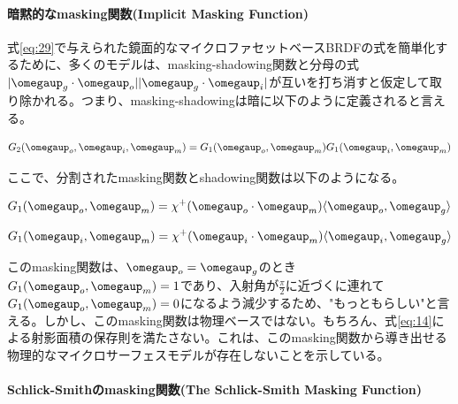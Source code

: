 \documentclass[a4j,xelatex,ja=standard]{bxjsarticle}
\begin{document}
\paragraph{暗黙的なmasking関数(Implicit Masking Function)}

式\eqref{eq:29}で与えられた鏡面的なマイクロファセットベースBRDFの式を簡単化するために、多くのモデルは、masking-shadowing関数と分母の式$|\boldsymbol{\omegaup}_g \cdot \boldsymbol{\omegaup}_o| |\boldsymbol{\omegaup}_g \cdot \boldsymbol{\omegaup}_i|$が互いを打ち消すと仮定して取り除かれる。つまり、masking-shadowingは暗に以下のように定義されると言える。

\begin{equation}
    G_2(\boldsymbol{\omegaup}_o, \boldsymbol{\omegaup}_i, \boldsymbol{\omegaup}_m) = G_1(\boldsymbol{\omegaup}_o, \boldsymbol{\omegaup}_m) G_1(\boldsymbol{\omegaup}_i, \boldsymbol{\omegaup}_m)
    \label{eq:55}
\end{equation}

ここで、分割されたmasking関数とshadowing関数は以下のようになる。

\begin{equation}
    G_1(\boldsymbol{\omegaup}_o, \boldsymbol{\omegaup}_m) = \chi^+(\boldsymbol{\omegaup}_o \cdot \boldsymbol{\omegaup}_m) \langle \boldsymbol{\omegaup}_o, \boldsymbol{\omegaup}_g \rangle
    \label{eq:56}
\end{equation}

\begin{equation}
    G_1(\boldsymbol{\omegaup}_i, \boldsymbol{\omegaup}_m) = \chi^+(\boldsymbol{\omegaup}_i \cdot \boldsymbol{\omegaup}_m) \langle \boldsymbol{\omegaup}_i, \boldsymbol{\omegaup}_g \rangle
    \label{eq:57}
\end{equation}

このmasking関数は、$\boldsymbol{\omegaup}_o = \boldsymbol{\omegaup}_g$のとき$G_1(\boldsymbol{\omegaup}_o, \boldsymbol{\omegaup}_m) = 1$であり、入射角が$\frac{\pi}{2}$に近づくに連れて$G_1(\boldsymbol{\omegaup}_o, \boldsymbol{\omegaup}_m) = 0$になるよう減少するため、"もっともらしい"と言える。しかし、このmasking関数は物理ベースではない。もちろん、式\eqref{eq:14}による射影面積の保存則を満たさない。これは、このmasking関数から導き出せる物理的なマイクロサーフェスモデルが存在しないことを示している。

\paragraph{Schlick-Smithのmasking関数(The Schlick-Smith Masking Function)}
\end{document}
